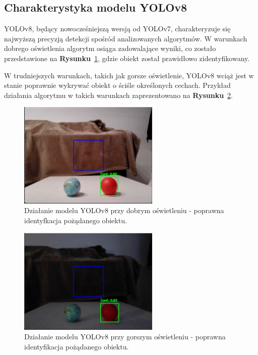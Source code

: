 \documentclass[a4paper,twoside,12pt]{book}
\begin{document}
\subsection{Charakterystyka modelu YOLOv8}

YOLOv8, będący nowocześniejszą wersją od YOLOv7, charakteryzuje się najwyższą precyzją detekcji spośród analizowanych algorytmów. W warunkach dobrego oświetlenia algorytm osiąga zadowalające wyniki, co zostało przedstawione na \textbf{Rysunku}~\ref{fig:yolov8_good_light}, gdzie obiekt został prawidłowo zidentyfikowany. 

W trudniejszych warunkach, takich jak gorsze oświetlenie, YOLOv8 wciąż jest w stanie poprawnie wykrywać obiekt o ściśle określonych cechach. Przykład działania algorytmu w takich warunkach zaprezentowano na \textbf{Rysunku}~\ref{fig:yolov8_bad_light}. 
\begin{figure}[h]
    \centering
    \includegraphics[width=0.6\textwidth]{Images/Porownanie/Yolo 8 laptop/Zrzut ekranu 2025-01-04 181013.png}
    \caption{Działanie modelu YOLOv8 przy dobrym oświetleniu - poprawna identyfkacja pożądanego obiektu.}
    \label{fig:yolov8_good_light}
\end{figure}

\begin{figure}[h]
    \centering
    \includegraphics[width=0.6\textwidth]{Images/Porownanie/Yolo 8 laptop/Zrzut ekranu 2025-01-04 181029.png}
    \caption{Działanie modelu YOLOv8 przy gorszym oświetleniu - poprawna identyfikacja pożądanego obiektu.}
    \label{fig:yolov8_bad_light}
\end{figure}
\newpage
\end{document}
